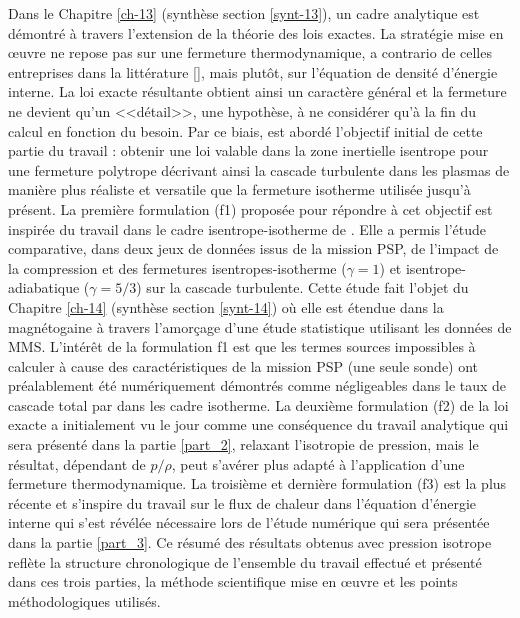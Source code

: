 Dans le Chapitre \ref{ch-13} (synthèse section \ref{synt-13}), un cadre analytique est démontré à travers l'extension de la théorie des lois exactes. La stratégie mise en œuvre ne repose pas sur une fermeture thermodynamique, a contrario de celles entreprises dans la littérature [\cite{galtier_exact_2011,banerjee_exact_2013,banerjee_kolmogorov-like_2014,andres_alternative_2017}], mais plutôt, sur l'équation de densité d'énergie interne. La loi exacte résultante obtient ainsi un caractère général et la fermeture ne devient qu'un <<détail>>, une hypothèse, à ne considérer qu'à la fin du calcul en fonction du besoin. Par ce biais, est abordé l'objectif initial de cette partie du travail : obtenir une loi valable dans la zone inertielle isentrope pour une fermeture polytrope décrivant ainsi la cascade turbulente dans les plasmas de manière plus réaliste et versatile que la fermeture isotherme utilisée jusqu'à présent. La première formulation (f1) proposée pour répondre à cet objectif est inspirée du travail dans le cadre isentrope-isotherme de \cite{andres_energy_2018}. Elle a permis l'étude comparative, dans deux jeux de données issus de la mission \ac{PSP}, de l'impact de la compression et des fermetures isentropes-isotherme ($\gamma = 1$) et isentrope-adiabatique ($\gamma = 5/3$) sur la cascade turbulente. Cette étude fait l'objet du Chapitre \ref{ch-14}  (synthèse section \ref{synt-14}) où elle est étendue dans la magnétogaine à travers l'amorçage d'une étude statistique utilisant les données de MMS. L'intérêt de la formulation f1 est que les termes sources impossibles à calculer à cause des caractéristiques de la mission \ac{PSP} (une seule sonde) ont préalablement été numériquement démontrés comme négligeables dans le taux de cascade total par \cite{andres_energy_2018} dans les cadre isotherme. La deuxième formulation (f2) de la loi exacte a initialement vu le jour comme une conséquence du travail analytique qui sera présenté dans la partie \ref{part_2}, relaxant l'isotropie de pression, mais le résultat, dépendant de $p/\rho$, peut s'avérer plus adapté à l'application d'une fermeture thermodynamique. La troisième et dernière formulation (f3) est la plus récente et s'inspire du travail sur le flux de chaleur dans l'équation d'énergie interne qui s'est révélée nécessaire lors de l'étude numérique qui sera présentée dans la partie \ref{part_3}. Ce résumé des résultats obtenus avec pression isotrope reflète la structure chronologique de l'ensemble du travail effectué et présenté dans ces trois parties, la méthode scientifique mise en œuvre et les points méthodologiques utilisés. 

